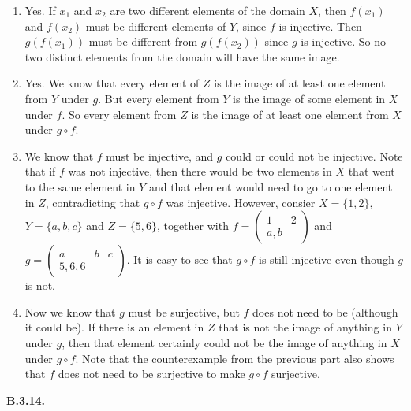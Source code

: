 \documentclass[10pt,]{book}
\theoremstyle{plain}
\theoremstyle{definition}
\theoremstyle{definition}
\theoremstyle{definition}
\theoremstyle{definition}
\numberwithin{equation}{chapter}
\newcommand{\twoline}[2]{\begin{pmatrix}#1 \\ #2 \end{pmatrix}}
\newcommand{\amp}{&}
\begin{document}
\begin{enumerate}[label=(\alph*)]
\item\hypertarget{li-633}{}\hypertarget{p-1764}{}%
Yes.  If \(x_1\) and \(x_2\) are two different elements of the domain \(X\), then \(f(x_1)\) and \(f(x_2)\) must be different elements of \(Y\), since \(f\) is injective.  Then \(g(f(x_1))\) must be different from \(g(f(x_2))\) since \(g\) is injective.  So no two distinct elements from the domain will have the same image.%
\item\hypertarget{li-634}{}\hypertarget{p-1765}{}%
Yes.  We know that every element of \(Z\) is the image of at least one element from \(Y\) under \(g\).  But every element from \(Y\) is the image of some element in \(X\) under \(f\).  So every element from \(Z\) is the image of at least one element from \(X\) under \(g\circ f\).%
\item\hypertarget{li-635}{}\hypertarget{p-1766}{}%
We know that \(f\) must be injective, and \(g\) could or could not be injective. Note that if \(f\) was not injective, then there would be two elements in \(X\) that went to the same element in \(Y\) and that element would need to go to one element in \(Z\), contradicting that \(g\circ f\) was injective. However, consier \(X = \{1,2\}\), \(Y = \{a, b, c\}\) and \(Z = \{5, 6\}\), together with \(f = \twoline{1 \amp 2}{a, b}\) and \(g = \twoline{a \amp b \amp c}{5, 6, 6}\). It is easy to see that \(g \circ f\) is still injective even though \(g\) is not.%
\item\hypertarget{li-636}{}\hypertarget{p-1767}{}%
Now we know that \(g\) must be surjective, but \(f\) does not need to be (although it could be). If there is an element in \(Z\) that is not the image of anything in \(Y\) under \(g\), then that element certainly could not be the image of anything in \(X\) under \(g\circ f\). Note that the counterexample from the previous part also shows that \(f\) does not need to be surjective to make \(g\circ f\) surjective.%
\end{enumerate}
%
\par\smallskip
\noindent\textbf{B.3.14.} \hypertarget{p-1771}{}%
\leavevmode%
\end{document}
